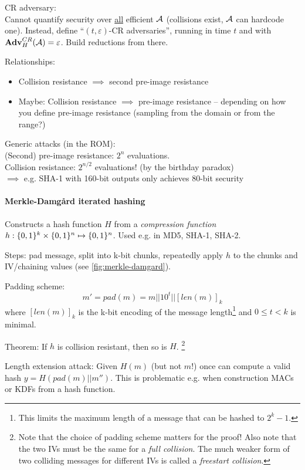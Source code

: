 CR adversary:\\
Cannot quantify security over \underline{all} efficient $\mathcal{A}$ (collisions exist, $\mathcal{A}$ can hardcode one).
Instead, define ``$(t, \varepsilon)$-CR adversaries'', running in time $t$ and with $\mathbf{Adv}^{CR}_H(\mathcal{A}) = \varepsilon$.
Build reductions from there.

Relationships:
\begin{itemize}
\item Collision resistance $\implies$ second pre-image resistance
\item Maybe: Collision resistance $\implies$ pre-image resistance -- depending on how you define pre-image resistance (sampling from the domain or from the range?)
\end{itemize}

Generic attacks (in the ROM):\\
(Second) pre-image resistance: $2^n$ evaluations.\\
Collision resistance: $2^{n/2}$ evaluations! (by the birthday paradox)\\
$\implies$ e.g. SHA-1 with 160-bit outputs only achieves 80-bit security

\paragraph{Merkle-Damgård iterated hashing}
Constructs a hash function $H$ from a \emph{compression function} \mbox{$h: \lbrace 0, 1 \rbrace^k \times \lbrace 0, 1 \rbrace^n \mapsto \lbrace 0, 1 \rbrace^n$}.
Used e.g. in MD5, SHA-1, SHA-2.

Steps: pad message, split into k-bit chunks, repeatedly apply $h$ to the chunks and IV/chaining values (see \autoref{fig:merkle-damgard}).

Padding scheme:
$$ m' = pad(m) = m || 10^t || [len(m)]_k $$
where $[len(m)]_k$ is the k-bit encoding of the message length\footnote{This limits the maximum length of a message that can be hashed to $2^k - 1$.}
and $0 \leq t < k$ is minimal.

Theorem: If $h$ is collision resistant, then so is $H$.%
\footnote{Note that the choice of padding scheme matters for the proof!
Also note that the two IVs must be the same for a \emph{full collision}.
The much weaker form of two colliding messages for different IVs is called a \emph{freestart collision}.}

Length extension attack:
Given $H(m)$ (but not $m$!) once can compute a valid hash $y=H(pad(m)||m'')$.
This is problematic e.g. when construction MACs or KDFs from a hash function.

